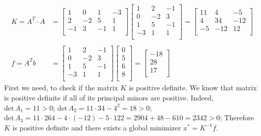 \documentclass[10pt,letter]{article}
\begin{document}
\begin{align*}
K = A^T \cdot A &=
\left[ {\begin{array}{cccc}
 1 &  0 & 1 & -3 \\
 2 &  -2 & 5 & 1 \\
 -1 &  3 & -1 & 1 \\
\end{array} } \right]
\left[ {\begin{array}{ccc}
 1 &  2 & -1 \\
 0 &  -2 & 3 \\
 1 &  5 & -1 \\
 -3 &  1 & 1 \\
\end{array} } \right]
=
\left[ {\begin{array}{ccc}
 11 & 4  & -5 \\
 4 & 34  & -12 \\
 -5 & -12  & 12 \\
\end{array} } \right]
\\\\ f = A^T b &= 
\left[ {\begin{array}{ccc}
 1 &  2 & -1 \\
 0 &  -2 & 3 \\
 1 &  5 & -1 \\
 -3 &  1 & 1 \\
\end{array} } \right]
\left[ {\begin{array}{c}
 0 \\
 5 \\
 6 \\
 8 \\
\end{array} } \right]
=
\left[ {\begin{array}{c}
 -18 \\
 28 \\
 17 \\
\end{array} } \right]
\end{align*}
First we need, to check if the matrix $K$ is positive definite. We know that matrix is positive definite if all of its principal minors are positive. Indeed, $\textrm{det}\,A_1 = 11 > 0$; $\textrm{det}\,A_2 = 11 \cdot 34 - 4^2 = 18 > 0$; $\textrm{det}\,A_3 = 11 \cdot 264 - 4 \cdot (-12) - 5 \cdot 122 = 2904 + 48 - 610 = 2342 > 0$; Therefore $K$ is positive definite and there exists a global minimizer $x^* = K^{-1}f$.

\pagebreak
\end{document}
